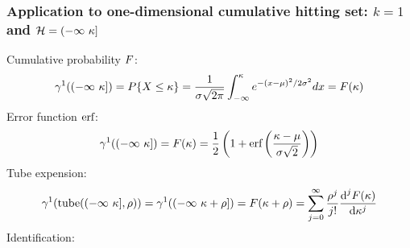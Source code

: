 \documentclass[12pt]{article}
\begin{document}
\subsubsection{Application to one-dimensional cumulative hitting set: $k=1$ and $\mathcal{H}=(-\infty\ \kappa]$}
Cumulative probability $F$:
\begin{equation}
  \gamma^1((-\infty\ \kappa]) = P\{X\le\kappa\}=\frac{1}{\sigma\sqrt{2\pi}} \int_{-\infty}^\kappa e^{-(x-\mu)^2/2\sigma^2} dx=F(\kappa)
\end{equation}
Error function $\text{erf}$:
\begin{equation}
  \gamma^1((-\infty\ \kappa])=F(\kappa)=\frac{1}{2}\left(1+\text{erf}\left(\frac{\kappa-\mu}{\sigma\sqrt{2}}\right)\right)
\end{equation}
Tube expension:
\begin{equation}
  \GaussMeas^1(\tube(\minfu,\ray))=\GaussMeas^1((-\infty\ \lset+\ray])=\CDP(\lset+\ray)=\sum_{j=0}^{\infty} \frac{\ray^j}{j!} \frac{\text{d}^j \CDP(\lset)}{\text{d} \lset^j}
\end{equation}
Identification:
\end{document}
